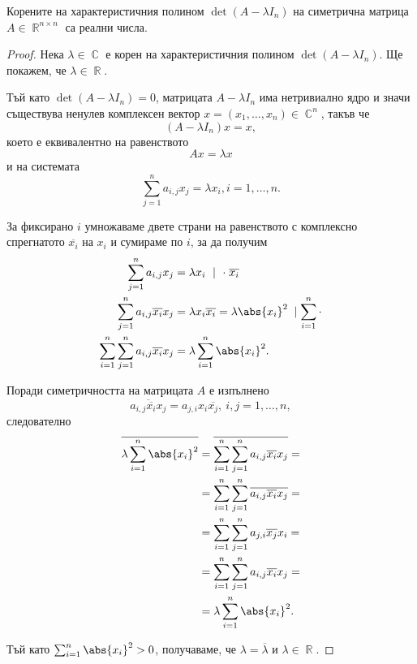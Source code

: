 \documentclass{../../common/topic}
\begin{document}
\begin{theorem}
  Корените на характеристичния полином \( \det(A - \lambda I_n) \) на симетрична матрица \( A \in \BbbR^{n \times n} \) са реални числа.
\end{theorem}

\begin{proof}
  Нека \( \lambda \in \BbbC \) е корен на характеристичния полином \( \det(A - \lambda I_n) \). Ще покажем, че \( \lambda \in \BbbR \).

  Тъй като \( \det(A - \lambda I_n) = 0 \), матрицата \( A - \lambda I_n \) има нетривиално ядро и значи съществува ненулев комплексен вектор \( x = (x_1, \ldots, x_n) \in \BbbC^n \), такъв че
  \begin{equation*}
    (A - \lambda I_n) x = x,
  \end{equation*}
  което е еквивалентно на равенството
  \begin{equation*}
    A x = \lambda x
  \end{equation*}
  и на системата
  \begin{equation*}
    \sum_{j=1}^n a_{i,j} x_j = \lambda x_i, i = 1, \ldots, n.
  \end{equation*}

  За фиксирано \( i \) умножаваме двете страни на равенството с комплексно спрегнатото \( \overline{x_i} \) на \( x_i \) и сумираме по \( i \), за да получим
  \begin{align*}
    \sum_{j=1}^n a_{i,j} x_j
    &=
    \lambda x_i \ \mid \ \cdot \; \overline{x_i}
    \\
    \sum_{j=1}^n a_{i,j} \overline{x_i} x_j
    &=
    \lambda x_i \overline{x_i} = \lambda \abs{x_i}^2\; \mid \sum_{i=1}^n \cdot
    \\
    \sum_{i=1}^n \sum_{j=1}^n a_{i,j} \overline{x_i} x_j
    &=
    \lambda \sum_{i=1}^n \abs{x_i}^2.
  \end{align*}

  Поради симетричността на матрицата \( A \) е изпълнено
  \begin{equation*}
    \overline{a_{i,j} \overline{x_i} x_j}
    =
    a_{j,i} x_i \overline{x_j},~i, j = 1, \ldots, n,
  \end{equation*}
  следователно
  \begin{align*}
    \overline{\lambda \sum_{i=1}^n \abs{x_i}^2}
    &=
    \overline{\sum_{i=1}^n \sum_{j=1}^n a_{i,j} \overline{x_i} x_j}
    = \\ &=
    \sum_{i=1}^n \sum_{j=1}^n \overline{a_{i,j} \overline{x_i} x_j}
    = \\ &=
    \sum_{i=1}^n \sum_{j=1}^n a_{j,i} \overline{x_j} x_i
    = \\ &=
    \sum_{i=1}^n \sum_{j=1}^n a_{i,j} \overline{x_i} x_j
    = \\ &=
    \lambda \sum_{i=1}^n \abs{x_i}^2.
  \end{align*}

  Тъй като \( \sum_{i=1}^n \abs{x_i}^2 > 0 \), получаваме, че \( \lambda = \overline{\lambda} \) и \( \lambda \in \BbbR \).
\end{proof}
\end{document}
